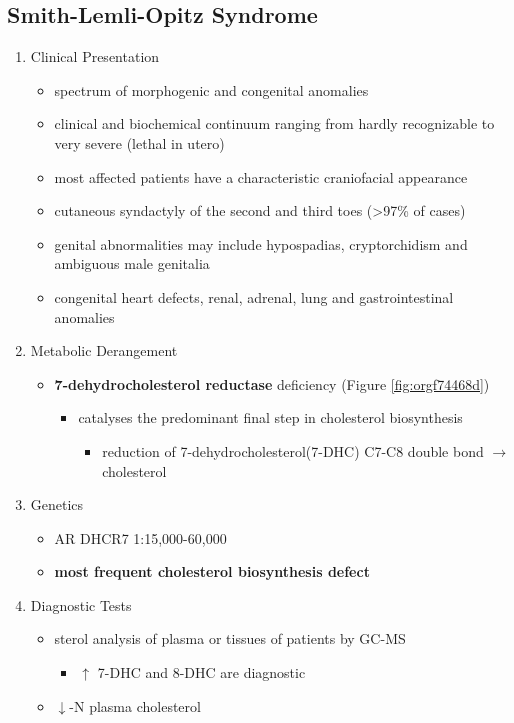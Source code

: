 \documentclass[12pt]{scrartcl}
\begin{document}
\subsection{Smith-Lemli-Opitz Syndrome}
\label{sec:org01d7b55}
\begin{enumerate}
\item Clinical Presentation
\label{sec:org611fc83}
\begin{itemize}
\item spectrum of morphogenic and congenital anomalies
\item clinical and biochemical continuum ranging from hardly recognizable
to very severe (lethal in utero)
\item most affected patients have a characteristic craniofacial appearance
\item cutaneous syndactyly of the second and third toes (>97\% of cases)
\item genital abnormalities may include hypospadias, cryptorchidism and
ambiguous male genitalia
\item congenital heart defects, renal, adrenal, lung and gastrointestinal
anomalies
\end{itemize}

\item Metabolic Derangement
\label{sec:org965d5a2}
\begin{itemize}
\item \textbf{7-dehydrocholesterol reductase} deficiency (Figure \ref{fig:orgf74468d})
\begin{itemize}
\item catalyses the predominant final step in cholesterol biosynthesis
\begin{itemize}
\item reduction of 7-dehydrocholesterol(7-DHC) C7-C8 double bond \(\to\) cholesterol
\end{itemize}
\end{itemize}
\end{itemize}

\item Genetics
\label{sec:orgecb454c}
\begin{itemize}
\item AR DHCR7 1:15,000-60,000
\item \textbf{most frequent cholesterol biosynthesis defect}
\end{itemize}

\item Diagnostic Tests
\label{sec:orgb2f25a5}
\begin{itemize}
\item sterol analysis of plasma or tissues of patients by GC-MS
\begin{itemize}
\item \(\uparrow\) 7-DHC and 8-DHC are diagnostic
\end{itemize}
\item \(\downarrow\)-N plasma cholesterol
\end{itemize}


\end{enumerate}
\end{document}
